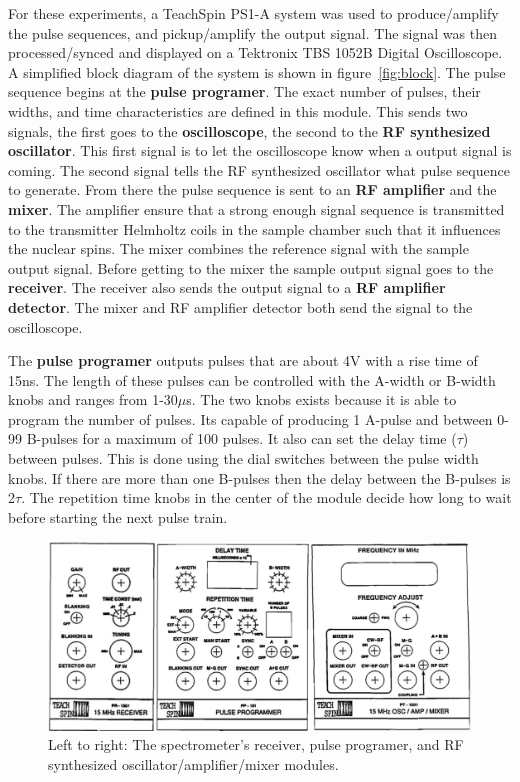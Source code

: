 \documentclass[
reprint,
amsmath,amssymb,
aps,
tikz,
border=5pt
]{revtex4-1}
\begin{document}
    For these experiments, a TeachSpin PS1-A system was used to produce/amplify the pulse sequences, and pickup/amplify the output signal. The signal was then processed/synced and displayed on a Tektronix TBS 1052B Digital Oscilloscope. A simplified block diagram of the system is shown in figure~\ref{fig:block}. The pulse sequence begins at the \textbf{pulse programer}. The exact number of pulses, their widths, and time characteristics are defined in this module. This sends two signals, the first goes to the \textbf{oscilloscope}, the second to the \textbf{RF synthesized oscillator}. This first signal is to let the oscilloscope know when a output signal is coming. The second signal tells the RF synthesized oscillator what pulse sequence to generate. From there the pulse sequence is sent to an \textbf{RF amplifier} and the \textbf{mixer}. The amplifier ensure that a strong enough signal sequence is transmitted to the transmitter Helmholtz coils in the sample chamber such that it influences the nuclear spins. The mixer combines the reference signal with the sample output signal. Before getting to the mixer the sample output signal goes to the \textbf{receiver}. The receiver also sends the output signal to a \textbf{RF amplifier detector}. The mixer and RF amplifier detector both send the signal to the oscilloscope. 
    
    The \textbf{pulse programer} outputs pulses that are about 4V with a rise time of 15ns. The length of these pulses can be controlled with the A-width or B-width knobs and ranges from 1-30$\mu$s. The two knobs exists because it is able to program the number of pulses. Its capable of producing 1 A-pulse and between 0-99 B-pulses for a maximum of 100 pulses. It also can set the delay time ($\tau$) between pulses. This is done using the dial switches between the pulse width knobs.  If there are more than one B-pulses then the delay between the B-pulses is 2$\tau$. The repetition time knobs in the center of the module decide how long to wait before starting the next pulse train. 
    
    \begin{figure}[h]
      \includegraphics[width=0.48 \textwidth]{figures/threemods.jpg}
      \caption{Left to right: The spectrometer's receiver, pulse programer, and RF synthesized oscillator/amplifier/mixer modules.\cite{manual}}
      \label{fig:threemods}
    \end{figure}
\end{document}
